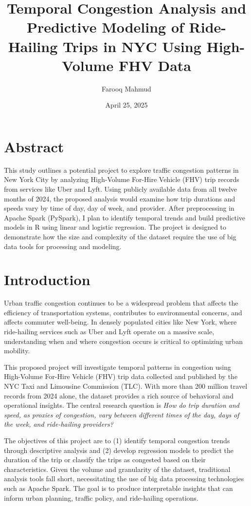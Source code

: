 \documentclass[12pt,letterpaper]{article}
\title{{\vspace{-2cm}}Temporal Congestion Analysis and Predictive Modeling of Ride-Hailing Trips in NYC Using High-Volume FHV Data}
\author{Farooq Mahmud}
\date{April 25, 2025}
\begin{document}
\maketitle

\section{Abstract}
This study outlines a potential project to explore traffic congestion patterns in New York City by analyzing High-Volume For-Hire Vehicle (FHV) trip records from services like Uber and Lyft. Using publicly available data from all twelve months of 2024, the proposed analysis would examine how trip durations and speeds vary by time of day, day of week, and provider. After preprocessing in Apache Spark (PySpark), I plan to identify temporal trends and build predictive models in R using linear and logistic regression. The project is designed to demonstrate how the size and complexity of the dataset require the use of big data tools for processing and modeling.


\section{Introduction}
Urban traffic congestion continues to be a widespread problem that affects the efficiency of transportation systems, contributes to environmental concerns, and affects commuter well-being. In densely populated cities like New York, where ride-hailing services such as Uber and Lyft operate on a massive scale, understanding when and where congestion occurs is critical to optimizing urban mobility.

This proposed project will investigate temporal patterns in congestion using High-Volume For-Hire Vehicle (FHV) trip data collected and published by the NYC Taxi and Limousine Commission (TLC). With more than 200 million travel records from 2024 alone, the dataset provides a rich source of behavioral and operational insights. The central research question is \textit{How do trip duration and speed, as proxies of congestion, vary between different times of the day, days of the week, and ride-hailing providers?}

The objectives of this project are to (1) identify temporal congestion trends through descriptive analysis and (2) develop regression models to predict the duration of the trip or classify the trips as congested based on their characteristics. Given the volume and granularity of the dataset, traditional analysis tools fall short, necessitating the use of big data processing technologies such as Apache Spark. The goal is to produce interpretable insights that can inform urban planning, traffic policy, and ride-hailing operations.
\end{document}
